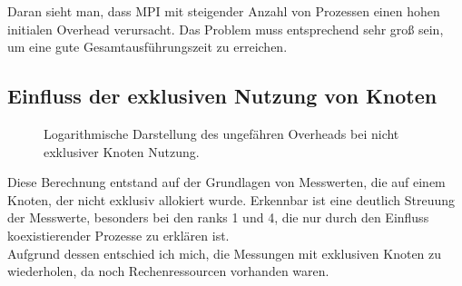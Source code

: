 \documentclass[german,plainarticle,hyperref,utf8]{zihpub}
\begin{document}
	Daran sieht man, dass MPI mit steigender Anzahl von Prozessen einen hohen initialen Overhead verursacht. Das Problem muss entsprechend sehr groß sein, um eine gute Gesamtausführungszeit zu erreichen.\\
	\clearpage
	\subsection{Einfluss der exklusiven Nutzung von Knoten}\label{exklusiv}
	\begin{figure}[h]
		\centering
		
		\caption{Logarithmische Darstellung des ungefähren Overheads bei nicht exklusiver Knoten Nutzung.}
	\end{figure}
	Diese Berechnung entstand auf der Grundlagen von Messwerten, die auf einem Knoten, der nicht exklusiv allokiert wurde. Erkennbar ist eine deutlich Streuung der Messwerte, besonders bei den ranks 1 und 4, die nur durch den Einfluss koexistierender Prozesse zu erklären ist.\\
	Aufgrund dessen entschied ich mich, die Messungen mit exklusiven Knoten zu wiederholen, da noch Rechenressourcen vorhanden waren. 
	\newpage
	\appendix
\end{document}
